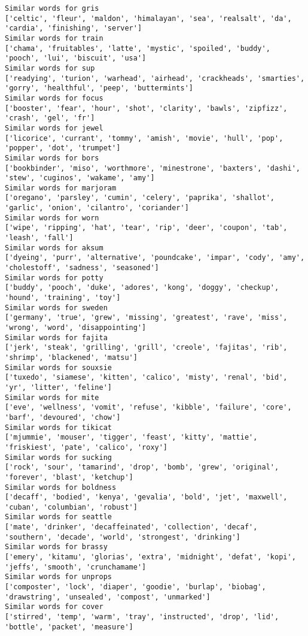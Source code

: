 \documentclass[11pt]{article}
\begin{document}
\begin{Verbatim}[commandchars=\\\{\}]
Similar words for gris
['celtic', 'fleur', 'maldon', 'himalayan', 'sea', 'realsalt', 'da', 'cardia', 'finishing', 'server']
Similar words for train
['chama', 'fruitables', 'latte', 'mystic', 'spoiled', 'buddy', 'pooch', 'lui', 'biscuit', 'usa']
Similar words for sup
['readying', 'turion', 'warhead', 'airhead', 'crackheads', 'smarties', 'gorry', 'healthful', 'peep', 'buttermints']
Similar words for focus
['booster', 'fear', 'hour', 'shot', 'clarity', 'bawls', 'zipfizz', 'crash', 'gel', 'fr']
Similar words for jewel
['licorice', 'currant', 'tommy', 'amish', 'movie', 'hull', 'pop', 'popper', 'dot', 'trumpet']
Similar words for bors
['bookbinder', 'miso', 'worthmore', 'minestrone', 'baxters', 'dashi', 'stew', 'cuginos', 'wakame', 'amy']
Similar words for marjoram
['oregano', 'parsley', 'cumin', 'celery', 'paprika', 'shallot', 'garlic', 'onion', 'cilantro', 'coriander']
Similar words for worn
['wipe', 'ripping', 'hat', 'tear', 'rip', 'deer', 'coupon', 'tab', 'leash', 'fall']
Similar words for aksum
['dyeing', 'purr', 'alternative', 'poundcake', 'impar', 'cody', 'amy', 'cholestoff', 'sadness', 'seasoned']
Similar words for potty
['buddy', 'pooch', 'duke', 'adores', 'kong', 'doggy', 'checkup', 'hound', 'training', 'toy']
Similar words for sweden
['germany', 'true', 'grew', 'missing', 'greatest', 'rave', 'miss', 'wrong', 'word', 'disappointing']
Similar words for fajita
['jerk', 'steak', 'grilling', 'grill', 'creole', 'fajitas', 'rib', 'shrimp', 'blackened', 'matsu']
Similar words for souxsie
['tuxedo', 'siamese', 'kitten', 'calico', 'misty', 'renal', 'bid', 'yr', 'litter', 'feline']
Similar words for mite
['eve', 'wellness', 'vomit', 'refuse', 'kibble', 'failure', 'core', 'barf', 'devoured', 'chow']
Similar words for tikicat
['mjummie', 'mouser', 'tigger', 'feast', 'kitty', 'mattie', 'friskiest', 'pate', 'calico', 'roxy']
Similar words for sucking
['rock', 'sour', 'tamarind', 'drop', 'bomb', 'grew', 'original', 'forever', 'blast', 'ketchup']
Similar words for boldness
['decaff', 'bodied', 'kenya', 'gevalia', 'bold', 'jet', 'maxwell', 'cuban', 'columbian', 'robust']
Similar words for seattle
['mate', 'drinker', 'decaffeinated', 'collection', 'decaf', 'southern', 'decade', 'world', 'strongest', 'drinking']
Similar words for brassy
['emery', 'kitamu', 'glorias', 'extra', 'midnight', 'defat', 'kopi', 'jeffs', 'smooth', 'crunchamame']
Similar words for unprops
['composter', 'lock', 'diaper', 'goodie', 'burlap', 'biobag', 'drawstring', 'unsealed', 'compost', 'unmarked']
Similar words for cover
['stirred', 'temp', 'warm', 'tray', 'instructed', 'drop', 'lid', 'bottle', 'packet', 'measure']

\end{Verbatim}
\end{document}
